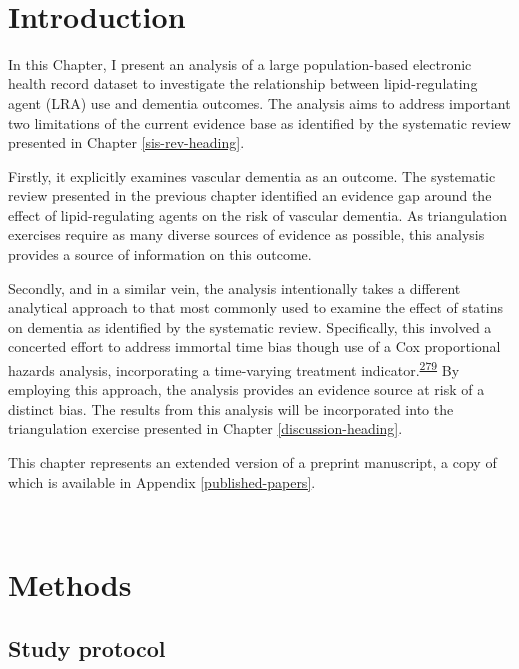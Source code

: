 \documentclass[a4paper, twoside]{templates/ociamthesis}
\begin{document}
~

\hypertarget{introduction-2}{%
\section{Introduction}\label{introduction-2}}

In this Chapter, I present an analysis of a large population-based electronic health record dataset to investigate the relationship between lipid-regulating agent (LRA) use and dementia outcomes. The analysis aims to address important two limitations of the current evidence base as identified by the systematic review presented in Chapter \ref{sis-rev-heading}.

Firstly, it explicitly examines vascular dementia as an outcome. The systematic review presented in the previous chapter identified an evidence gap around the effect of lipid-regulating agents on the risk of vascular dementia. As triangulation exercises require as many diverse sources of evidence as possible, this analysis provides a source of information on this outcome.

Secondly, and in a similar vein, the analysis intentionally takes a different analytical approach to that most commonly used to examine the effect of statins on dementia as identified by the systematic review. Specifically, this involved a concerted effort to address immortal time bias though use of a Cox proportional hazards analysis, incorporating a time-varying treatment indicator.\textsuperscript{\protect\hyperlink{ref-suissa2008}{279}} By employing this approach, the analysis provides an evidence source at risk of a distinct bias. The results from this analysis will be incorporated into the triangulation exercise presented in Chapter \ref{discussion-heading}.

This chapter represents an extended version of a preprint manuscript, a copy of which is available in Appendix \ref{published-papers}.

~

\hypertarget{methods-1}{%
\section{Methods}\label{methods-1}}

\hypertarget{study-protocol}{%
\subsection{Study protocol}\label{study-protocol}}
\end{document}
